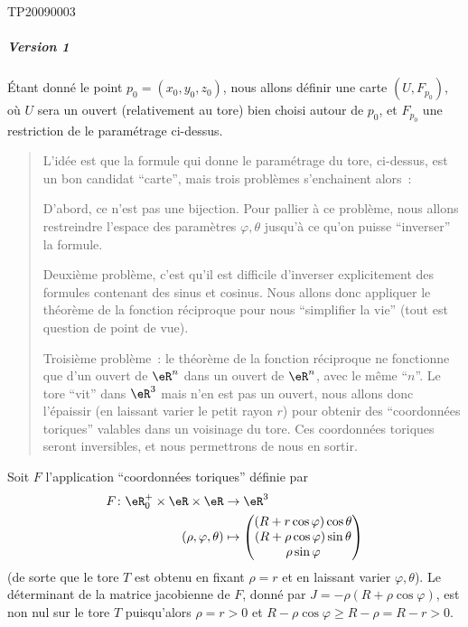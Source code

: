 \begin{corrige}{TP20090003}
	\subparagraph{Version 1} Étant donné le point $p_0 = (x_0,y_0,z_0)$,
	nous allons définir une carte $(U,F_{p_0})$, où $U$ sera un ouvert
	(relativement au tore) bien choisi autour de $p_0$, et $F_{p_0}$ une
	restriction de le paramétrage ci-dessus.

	\begin{quote}
		L'idée est que la formule qui donne le paramétrage du tore,
		ci-dessus, est un bon candidat ``carte'', mais trois problèmes
		s'enchainent alors~:

		D'abord, ce n'est pas une bijection. Pour pallier à ce problème,
		nous allons restreindre l'espace des paramètres $\varphi,\theta$
		jusqu'à ce qu'on puisse ``inverser'' la formule.

		Deuxième problème, c'est qu'il est difficile d'inverser
		explicitement des formules contenant des sinus et cosinus. Nous
		allons donc appliquer le théorème de la fonction réciproque pour
		nous ``simplifier la vie'' (tout est question de point de vue).

		Troisième problème~: le théorème de la fonction réciproque ne
		fonctionne que d'un ouvert de $\eR^n$ dans un ouvert de $\eR^n$,
		avec le même ``$n$''. Le tore ``vit'' dans $\eR^3$ mais n'en est pas un
		ouvert, nous allons donc l'épaissir (en laissant varier le petit
		rayon $r$) pour obtenir des ``coordonnées toriques'' valables dans
		un voisinage du tore. Ces coordonnées toriques seront inversibles,
		et nous permettrons de nous en sortir.
	\end{quote}

	Soit $F$ l'application ``coordonnées toriques'' définie par
	\begin{equation}
		\begin{aligned}
			F\colon \eR_0^+\times\eR\times\eR & \to \eR^3                             \\
			(\rho,\varphi,\theta)             & \mapsto \begin{pmatrix}
				                                            (R+r\cos\varphi)\cos\theta    \\
				                                            (R+\rho\cos\varphi)\sin\theta \\
				                                            \rho\sin\varphi
			                                            \end{pmatrix}
		\end{aligned}
	\end{equation}
	(de sorte que le tore $T$ est obtenu en fixant $\rho = r$ et en
	laissant varier $\varphi,\theta$).  Le déterminant de la matrice
	jacobienne de $F$, donné par $J = -\rho (R+\rho \cos \varphi)$, est
	non nul sur le tore $T$ puisqu'alors $\rho = r > 0$ et $R - \rho
		\cos\varphi \geq R - \rho = R - r > 0$.


\end{corrige}
